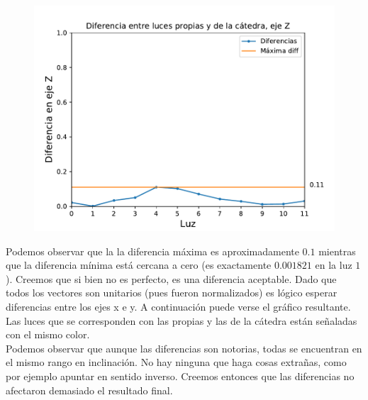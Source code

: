 {\centering
\begin{figure}[H]
\centering
    \includegraphics[scale=0.7]{informe/imagenes/lucesEjezDiferencias.pdf}
    \end{figure}
}

Podemos observar que la la diferencia máxima es aproximadamente $0.1$ mientras que la diferencia mínima está cercana a cero (es exactamente $0.001821$ en la luz $1$). Creemos que si bien no es perfecto, es una diferencia aceptable. Dado que todos los vectores son unitarios (pues fueron normalizados) es lógico esperar diferencias entre los ejes x e y. A continuación puede verse el gráfico resultante. Las luces que se corresponden con las propias y las de la cátedra están señaladas con el mismo color. \\

Podemos observar que aunque las diferencias son notorias, todas se encuentran en el mismo rango en inclinación. No hay ninguna que haga cosas extrañas, como por ejemplo apuntar en sentido inverso. Creemos entonces que las diferencias no afectaron demasiado el resultado final.

